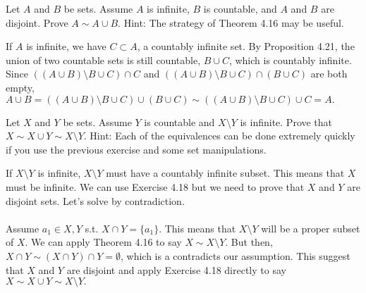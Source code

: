 \documentclass[12pt,letterpaper,boxed]{hmcpset}
\begin{document}

\begin{problem}[Exercise 4.18.]
Let $A$ and $B$ be sets. Assume $A$ is infinite, $B$ is countable, and $A$ and $B$ are disjoint. Prove $A \sim A \cup B.$ Hint: The strategy of Theorem 4.16 may be useful. 
\end{problem}


\begin{solution}
If $A$ is infinite, we have $C\subset A$, a countably infinite set. By Proposition 4.21, the union of two countable sets is still countable, $B\cup C$, which is countably infinite. Since $((A\cup B)\setminus B\cup C) \cap C$ and $((A\cup B)\setminus B\cup C) \cap (B\cup C)$ are both empty, $A \cup B = ((A\cup B)\setminus B\cup C) \cup (B\cup C) \sim ((A\cup B)\setminus B\cup C) \cup C = A.$
\end{solution}

\begin{problem}[Exercise 4.19.]
Let $X$ and $Y$ be sets. Assume $Y$ is countable and $X\setminus Y$ is infinite. Prove that $X \sim X \cup Y \sim X \setminus Y.$ Hint: Each of the equivalences can be done extremely quickly if you use the previous exercise and some set manipulations.
\end{problem}

\begin{solution}
If $X\setminus Y$ is infinite, $X \setminus Y$ must have a countably infinite subset. This means that $X$ must be infinite. We can use Exercise 4.18 but we need to prove that $X$ and $Y$ are disjoint sets. Let's solve by contradiction.
\\ \\
Assume $a_1 \in X, Y$ s.t. $X \cap Y = \{a_1\}.$ This means that $X \setminus Y$ will be a proper subset of $X$. We can apply Theorem 4.16 to say $X \sim X\setminus Y.$ But then, $X \cap Y \sim (X \cap Y)\cap Y = \emptyset$, which is a contradicts our assumption. This suggest that $X$ and $Y$ are disjoint and apply Exercise 4.18 directly to say $X \sim X \cup Y \sim X \setminus Y.$
\end{solution}
\end{document}

